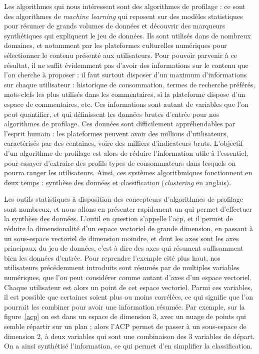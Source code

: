 \documentclass[a4paper,14pt]{extreport}
\begin{document}
Les algorithmes qui nous intéressent sont des algorithmes de profilage : ce sont des algorithmes de \textit{machine learning} qui reposent sur des modèles statistiques pour résumer de grands volumes de données et découvrir des marqueurs synthétiques qui expliquent le jeu de données. Ils sont utilisés dans de nombreux domaines, et notamment par les plateformes culturelles numériques pour sélectionner le contenu présenté aux utilisateurs. Pour pouvoir parvenir à ce résultat, il ne suffit évidemment pas d'avoir des informations sur le contenu que l'on cherche à proposer : il faut surtout disposer d'un maximum d'informations sur chaque utilisateur : historique de consommation, termes de recherche préférés, mots-clefs les plus utilisés dans les commentaires, si la plateforme dispose d'un espace de commentaires, etc. Ces informations sont autant de variables que l'on peut quantifier, et qui définissent les données brutes d'entrée pour nos algorithmes de profilage. Ces données sont difficilement appréhendables par l'esprit humain : les plateformes peuvent avoir des millions d'utilisateurs, caractérisés par des centaines, voire des milliers d'indicateurs bruts. L'objectif d'un algorithme de profilage est alors de réduire l'information utile à l'essentiel, pour essayer d'extraire des profils types de consommateurs dans lesquels on pourra ranger les utilisateurs. Ainsi, ces systèmes algorithmiques fonctionnent en deux temps : synthèse des données et classification (\textit{clustering} en anglais).

Les outils statistiques à disposition des concepteurs d'algorithmes de profilage sont nombreux, et nous allons en présenter rapidement un qui permet d'effectuer la synthèse des données. L'outil en question s'appelle l'\gls{acp}, et il permet de réduire la dimensionalité d'un espace vectoriel de grande dimension, en passant à un sous-espace vectoriel de dimension moindre, et dont les axes sont les axes principaux du jeu de données, c'est à dire des axes qui résument suffisamment bien les données d'entrée. Pour reprendre l'exemple cité plus haut, nos utilisateurs précédemment introduits sont résumés par de multiples variables numériques, que l'on peut considérer comme autant d'axes d'un espace vectoriel. Chaque utilisateur est alors un point de cet espace vectoriel. Parmi ces variables, il est possible que certaines soient plus ou moins corrélées, ce qui signifie que l'on pourrait les combiner pour avoir une information résumée. Par exemple, sur la figure~\ref{acp} on est dans un espace de dimension 3, avec un nuage de points qui semble répartir sur un plan ; alors l'ACP permet de passer à un sous-espace de dimension 2, à deux variables qui sont une combinaison des 3 variables de départ. On a ainsi synthétisé l'information, ce qui permet d'en simplifier la classification.
\end{document}
